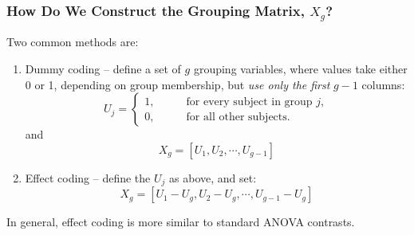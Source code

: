 \documentclass{beamer}
\begin{document}
\begin{frame}
  \frametitle{How Do We Construct the Grouping Matrix, $X_g$?}

Two common methods are:

\begin{enumerate}
\item Dummy coding -- define a set of $g$ grouping variables, where values take either 0 or 1, depending on group membership, but \emph{use only the first} $g-1$ columns:
%
\begin{equation*}
U_j = \left\{
\begin{aligned}
1, &\qquad \text{for every subject in group } j, \\
0, &\qquad \text{for all other subjects.}
\end{aligned}
\right.
\end{equation*}
and
%
$$
X_g= [U_1, U_2, \cdots, U_{g-1}]
$$
%
\item Effect coding -- define the $U_j$ as above, and set:
$$
X_g = [U_1 - U_g, U_2-U_g, \cdots, U_{g-1} - U_g]
$$
\end{enumerate}

In general, effect coding is more similar to standard ANOVA contrasts.

\end{frame}
\end{document}

